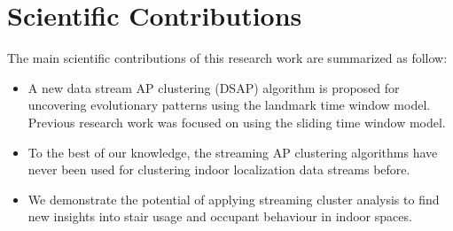 



 






\section{Scientific Contributions}


The main scientific contributions of this research work are summarized as follow:

\begin{itemize}
    
    \item A new data stream AP clustering (DSAP) algorithm is proposed for uncovering evolutionary patterns using the landmark time window model. Previous research work was focused on using the sliding time window model.
    
    \item  To the best of our knowledge, the streaming AP clustering algorithms have never been used for clustering indoor localization data streams before. 
    
    \item We demonstrate the potential of applying streaming cluster analysis to find new insights into stair usage and occupant behaviour in indoor spaces.
\end{itemize}




